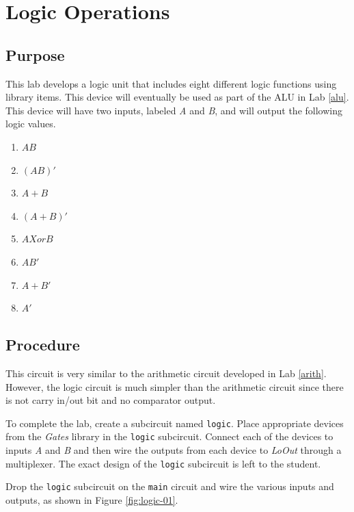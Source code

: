 \chapter{Logic Operations}\label{logic}

\section{Purpose}

This lab develops a logic unit that includes eight different logic functions using \LE library items. This device will eventually be used as part of the \acf{ALU} in Lab \ref{alu}. This device will have two inputs, labeled \textit{A} and \textit{B}, and will output the following logic values.

\begin{enumerate}
	\item $ AB $
	\item $ (AB)' $
	\item $ A+B $
	\item $ (A+B)' $
	\item $ A Xor B $
	\item $ AB' $
	\item $ A+B' $
	\item $ A' $
\end{enumerate}

\section{Procedure}

This circuit is very similar to the arithmetic circuit developed in Lab \ref{arith}. However, the logic circuit is much simpler than the arithmetic circuit since there is not carry in/out bit and no comparator output.

To complete the lab, create a subcircuit named \lstinline[columns=fixed]|logic|. Place appropriate devices from the \textit{Gates} library in the \lstinline[columns=fixed]|logic| subcircuit. Connect each of the devices to inputs \textit{A} and \textit{B} and then wire the outputs from each device to \textit{LoOut} through a multiplexer. The exact design of the \lstinline[columns=fixed]|logic| subcircuit is left to the student.  

Drop the \lstinline[columns=fixed]|logic| subcircuit on the  \lstinline[columns=fixed]|main| circuit and wire the various inputs and outputs, as shown in Figure \ref{fig:logic-01}. 

